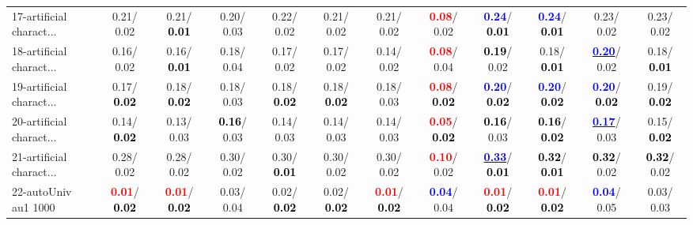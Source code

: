 \begin{table}[h]
\begin{center}
{\begin{tabular}{lc|c|c|c|c|c|c|c|c|c|c}
17-artificial charact... &   0.21/  0.02 &   0.21/\textcolor{black}{\textbf{  0.01}} &   0.20/  0.03 &   0.22/  0.02 &   0.21/  0.02 &   0.21/  0.02 & \textcolor{red}{\textbf{  0.08}}/  0.02 & \textcolor{blue}{\textbf{  0.24}}/\textcolor{black}{\textbf{  0.01}} & \textcolor{blue}{\textbf{  0.24}}/\textcolor{black}{\textbf{  0.01}} &   0.23/  0.02 &   0.23/  0.02 \\
18-artificial charact... &   0.16/  0.02 &   0.16/\textcolor{black}{\textbf{  0.01}} &   0.18/  0.04 &   0.17/  0.02 &   0.17/  0.02 &   0.14/  0.02 & \textcolor{red}{\textbf{  0.08}}/  0.04 & \textcolor{black}{\textbf{  0.19}}/  0.02 &   0.18/\textcolor{black}{\textbf{  0.01}} & \underline{\textcolor{blue}{\textbf{  0.20}}}/  0.02 &   0.18/\textcolor{black}{\textbf{  0.01}} \\
19-artificial charact... &   0.17/\textcolor{black}{\textbf{  0.02}} &   0.18/\textcolor{black}{\textbf{  0.02}} &   0.18/  0.03 &   0.18/\textcolor{black}{\textbf{  0.02}} &   0.18/\textcolor{black}{\textbf{  0.02}} &   0.18/  0.03 & \textcolor{red}{\textbf{  0.08}}/\textcolor{black}{\textbf{  0.02}} & \textcolor{blue}{\textbf{  0.20}}/\textcolor{black}{\textbf{  0.02}} & \textcolor{blue}{\textbf{  0.20}}/\textcolor{black}{\textbf{  0.02}} & \textcolor{blue}{\textbf{  0.20}}/\textcolor{black}{\textbf{  0.02}} &   0.19/\textcolor{black}{\textbf{  0.02}} \\
20-artificial charact... &   0.14/\textcolor{black}{\textbf{  0.02}} &   0.13/  0.03 & \textcolor{black}{\textbf{  0.16}}/  0.03 &   0.14/  0.03 &   0.14/  0.03 &   0.14/  0.03 & \textcolor{red}{\textbf{  0.05}}/\textcolor{black}{\textbf{  0.02}} & \textcolor{black}{\textbf{  0.16}}/  0.03 & \textcolor{black}{\textbf{  0.16}}/\textcolor{black}{\textbf{  0.02}} & \underline{\textcolor{blue}{\textbf{  0.17}}}/  0.03 &   0.15/\textcolor{black}{\textbf{  0.02}} \\
21-artificial charact... &   0.28/  0.02 &   0.28/  0.02 &   0.30/  0.02 &   0.30/\textcolor{black}{\textbf{  0.01}} &   0.30/  0.02 &   0.30/  0.02 & \textcolor{red}{\textbf{  0.10}}/  0.02 & \underline{\textcolor{blue}{\textbf{  0.33}}}/\textcolor{black}{\textbf{  0.01}} & \textcolor{black}{\textbf{  0.32}}/\textcolor{black}{\textbf{  0.01}} & \textcolor{black}{\textbf{  0.32}}/  0.02 & \textcolor{black}{\textbf{  0.32}}/  0.02 \\ \hline
22-autoUniv au1 1000 & \textcolor{red}{\textbf{  0.01}}/\textcolor{black}{\textbf{  0.02}} & \textcolor{red}{\textbf{  0.01}}/\textcolor{black}{\textbf{  0.02}} &   0.03/  0.04 &   0.02/\textcolor{black}{\textbf{  0.02}} &   0.02/\textcolor{black}{\textbf{  0.02}} & \textcolor{red}{\textbf{  0.01}}/\textcolor{black}{\textbf{  0.02}} & \textcolor{blue}{\textbf{  0.04}}/  0.04 & \textcolor{red}{\textbf{  0.01}}/\textcolor{black}{\textbf{  0.02}} & \textcolor{red}{\textbf{  0.01}}/\textcolor{black}{\textbf{  0.02}} & \textcolor{blue}{\textbf{  0.04}}/  0.05 &   0.03/  0.03 \\

\end{tabular}}
\end{center}
\end{table}
